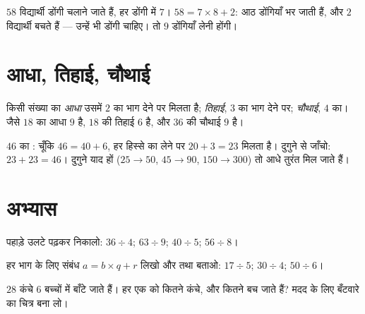 \begin{example}\label{ex:g3:division:interpret}
$58$ विद्यार्थी डोंगी चलाने जाते हैं, हर डोंगी में $7$।
$58 = 7 \times 8 + 2$: आठ डोंगियाँ भर जाती हैं, और $2$
विद्यार्थी बचते हैं --- उन्हें भी डोंगी चाहिए। तो $9$ डोंगियाँ
लेनी होंगी।
\end{example}

\section{आधा, तिहाई, चौथाई}

\begin{definition}[आधा, तिहाई, चौथाई]\label{def:g3:division:half}
किसी संख्या का \emph{आधा} उसमें $2$ का भाग देने पर मिलता है;
\emph{तिहाई}, $3$ का भाग देने पर; \emph{चौथाई}, $4$ का। जैसे
$18$ का आधा $9$ है, $18$ की तिहाई $6$ है, और $36$ की चौथाई
$9$ है।
\end{definition}

\begin{example}[दुगुना और आधा साथ-साथ चलते हैं]\label{ex:g3:division:double}
$46$ का : चूँकि $46 = 40 + 6$, हर हिस्से का  लेने पर
$20 + 3 = 23$ मिलता है। दुगुने से जाँचो: $23 + 23 = 46$। दुगुने
याद हों ($25 \to 50$, $45 \to 90$, $150 \to 300$) तो आधे तुरंत
मिल जाते हैं।
\end{example}

\section{अभ्यास}

\begin{exercise}[$\star$]\label{exo:g3:division:1}
पहाड़े उलटे पढ़कर निकालो: $36 \div 4$; \quad $63 \div 9$;
\quad $40 \div 5$; \quad $56 \div 8$।
\end{exercise}

\begin{exercise}[$\star$]\label{exo:g3:division:2}
हर भाग के लिए संबंध $a = b \times q + r$ लिखो और  तथा
 बताओ: $17 \div 5$; \quad $30 \div 4$; \quad
$50 \div 6$।
\end{exercise}

\begin{exercise}[$\star$]\label{exo:g3:division:3}
$28$ कंचे $6$ बच्चों में बाँटे जाते हैं। हर एक को कितने कंचे,
और कितने बच जाते हैं? मदद के लिए बँटवारे का चित्र बना लो।
\end{exercise}

